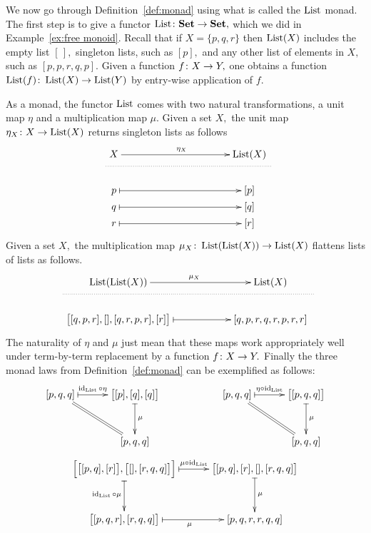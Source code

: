 \documentclass[../main/CT4S-EN-RU]{subfiles}
\begin{document}
\begin{exampleENG}\label{ex:monad}
We now go through Definition~\ref{def:monad} using what is called the $\operatorname{List}$ monad. The first step is to give a functor $\operatorname{List}\colon{\mathbf{Set}}\rightarrow{\mathbf{Set}},$ which we did in Example~\ref{ex:free monoid}. Recall that if $X=\{p,q,r\}$ then $\operatorname{List}(X)$ includes the empty list $[\,],$ singleton lists, such as $[p],$ and any other list of elements in $X,$ such as $[p,p,r,q,p].$ Given a function $f\colon X\rightarrow Y,$ one obtains a function $\operatorname{List}(f)\colon\operatorname{List}(X)\rightarrow\operatorname{List}(Y)$ by entry-wise application of $f.$

As a monad, the functor $\operatorname{List}$ comes with two natural transformations, a unit map $\eta$ and a multiplication map $\mu.$ Given a set $X,$ the unit map $\eta_X\colon X\rightarrow\operatorname{List}(X)$ returns singleton lists as follows
$$\xymatrix@=.5pt{
&X\ar[rr]^{\eta_X}&\hspace{1.4in}&\List(X)\\
\ar@{..}[rrr]+<.3in,0pt>&&&\\\\\\
&p\ar@{|->}[rr]&&[p]\\
&q\ar@{|->}[rr]&&[q]\\
&r\ar@{|->}[rr]&&[r]}$$
Given a set $X,$ the multiplication map $\mu_X\colon\operatorname{List}(\operatorname{List}(X))\rightarrow\operatorname{List}(X)$ flattens lists of lists as follows.
$$\xymatrix@=.5pt{
&\List(\List(X))\ar[rr]^{\mu_X}&\hspace{.7in}&\List(X)\\
\ar@{..}[rrr]+<.6in,0pt>&&&\\\\\\
&\big[[q, p, r], [], [q, r, p, r], [r]\big]\ar@{|->}[rr]&&[q, p, r, q, r, p, r, r]}$$
The naturality of $\eta$ and $\mu$ just mean that these maps work appropriately well under term-by-term replacement by a function $f\colon X\rightarrow Y.$ Finally the three monad laws from Definition~\ref{def:monad} can be exemplified as follows:
$$\xymatrix@=30pt{
[p, q, q]\ar@{|->}[r]^-{\id_{\List}\circ\eta}\ar@{=}[rd]&\big[[p], [q], [q]\big]\ar@{|->}[d]^\mu\\&[p, q, q]
}\hspace{.8in}
\xymatrix@=30pt{
[p, q, q]\ar@{|->}[r]^-{\eta\circ\id_{\List}}\ar@{=}[rd]&\big[[p, q, q]\big]\ar@{|->}[d]^\mu\\&[p,q,q]
}$$
\vspace{.1in}
$$\xymatrix@=30pt{
\Big[\big[[p, q], [r]\big], \big[[], [r, q, q]\big]\Big]\ar@{|->}[r]^-{\mu\circ\id_{\List}}\ar@{|->}[d]_{\id_{\List}\circ\mu}&\big[[p, q], [r], [], [r, q, q]\big]\ar@{|->}[d]^\mu\\\big[[p, q, r], [r, q, q]\big]\ar@{|->}[r]_\mu&[p, q, r, r, q,q]
}$$
\end{exampleENG}
\end{document}
